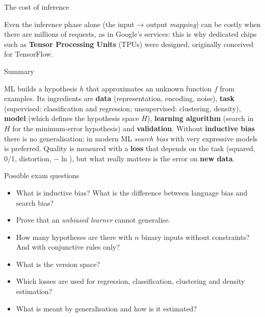 \begin{boxnote}{The cost of inference}

Even the inference phase alone (the input → output \emph{mapping}) can
be costly when there are millions of requests, as in Google's services:
this is why dedicated chips such as \textbf{Tensor Processing Units}
(TPUs) were designed, originally conceived for TensorFlow.

\end{boxnote}

\begin{boxabstract}{Summary}

ML builds a hypothesis \(h\) that approximates an unknown function
\(f\) from examples. Its ingredients are \textbf{data}
(representation, encoding, noise), \textbf{task} (supervised:
classification and regression; unsupervised: clustering, density),
\textbf{model} (which defines the hypothesis space \(H\)),
\textbf{learning algorithm} (search in \(H\) for the minimum-error
hypothesis) and \textbf{validation}. Without \textbf{inductive bias}
there is no generalisation; in modern ML \emph{search bias} with very
expressive models is preferred. Quality is measured with a
\textbf{loss} that depends on the task (squared, 0/1, distortion,
\(-\ln\)), but what really matters is the error on \textbf{new data}.

\end{boxabstract}

\begin{boxquestion}{Possible exam questions}

\begin{itemize}
\tightlist
\item
  What is inductive bias? What is the difference between language bias
  and search bias?
\item
  Prove that an \emph{unbiased learner} cannot generalise.
\item
  How many hypotheses are there with \(n\) binary inputs without
  constraints? And with conjunctive rules only?
\item
  What is the version space?
\item
  Which losses are used for regression, classification, clustering and
  density estimation?
\item
  What is meant by generalisation and how is it estimated?
\end{itemize}

\end{boxquestion}
